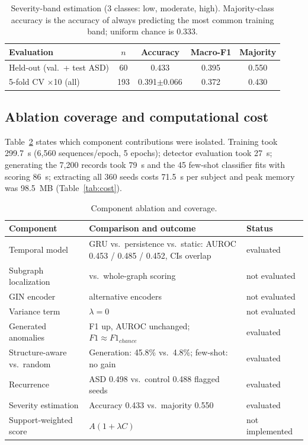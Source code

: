 \documentclass[conference]{IEEEtran}
\begin{document}
\begin{table}[!tbp]
\caption{Severity-band estimation (3 classes: low, moderate, high). Majority-class accuracy is the accuracy of always predicting the most common training band; uniform chance is 0.333.}
\label{tab:severity}
\centering\footnotesize
\begin{tabular}{@{}lcccc@{}}
\toprule
Evaluation & $n$ & Accuracy & Macro-F1 & Majority \\
\midrule
Held-out (val.\ + test ASD) & 60 & 0.433 & 0.395 & 0.550 \\
5-fold CV $\times$10 (all) & 193 & 0.391$\pm$0.066 & 0.372 & 0.430 \\
\bottomrule
\end{tabular}
\end{table}

\subsection{Ablation coverage and computational cost}
Table~\ref{tab:ablation} states which component contributions were isolated. Training took 299.7~s (6,560 sequences/epoch, 5 epochs); detector evaluation took 27~s; generating the 7,200 records took 79~s and the 45 few-shot classifier fits with scoring 86~s; extracting all 360 seeds costs 71.5~s per subject and peak memory was 98.5~MB (Table~\ref{tab:cost}).

\begin{table}[!tbp]
\caption{Component ablation and coverage.}
\label{tab:ablation}
\centering\footnotesize
\setlength{\tabcolsep}{3pt}
\begin{tabular}{@{}p{2.25cm}p{3.6cm}p{1.7cm}@{}}
\toprule
Component & Comparison and outcome & Status \\
\midrule
Temporal model & GRU vs.\ persistence vs.\ static: AUROC 0.453 / 0.485 / 0.452, CIs overlap & evaluated \\
Subgraph localization & vs.\ whole-graph scoring & not evaluated \\
GIN encoder & alternative encoders & not evaluated \\
Variance term & $\lambda{=}0$ & not evaluated \\
Generated anomalies & F1 up, AUROC unchanged; $F1\approx F1_{chance}$ & evaluated \\
Structure-aware vs.\ random & Generation: 45.8\% vs.\ 4.8\%; few-shot: no gain & evaluated \\
Recurrence & ASD 0.498 vs.\ control 0.488 flagged seeds & evaluated \\
Severity estimation & Accuracy 0.433 vs.\ majority 0.550 & evaluated \\
Support-weighted score & $A(1{+}\lambda C)$ & not implemented \\
\bottomrule
\end{tabular}
\end{table}
\end{document}
